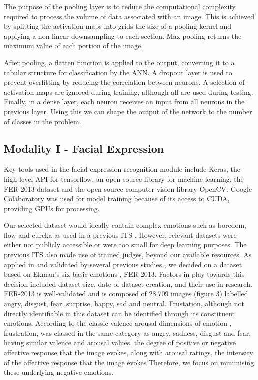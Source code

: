 \documentclass[12pt,a4paper]{article}
\begin{document}
The purpose of the pooling layer is to reduce the computational complexity required to process the volume of data associated with an image. This is achieved by splitting the activation maps into grids the size of a pooling kernel and applying a non-linear downsampling to each section. Max pooling returns the maximum value of each portion of the image.

After pooling, a flatten function is applied to the output, converting it to a tabular structure for classification by the ANN. A dropout layer is used to prevent overfitting by reducing the correlation between neurons. A selection of activation maps are ignored during training, although all are used during testing. Finally, in a dense layer, each neuron receives an input from all neurons in the previous layer. Using this we can shape the output of the network to the number of classes in the problem.

\subsection{Modality I - Facial Expression}
Key tools used in the facial expression recognition module include Keras, the high-level API for tensorflow, an open source library for machine learning, the FER-2013 dataset \cite{giannopoulos2018deep} and the open source computer vision library OpenCV. Google Colaboratory was used for model training because of its access to CUDA, providing GPUs for processing.

Our selected dataset would ideally contain complex emotions such as boredom, flow and eureka as used in a previous ITS \cite{barron2012intelligent}. However, relevant datasets were either not publicly accessible or were too small for deep learning purposes. The previous ITS also made use of trained judges, beyond our available resources. As applied in and validated by several previous studies
\cite{woolf2009affect}, we decided on a dataset based on Ekman's six basic emotions \cite{ekman1992argument}, FER-2013. Factors in play towards this decision included dataset size, date of dataset creation, and their use in research. FER-2013 is well-validated \cite{giannopoulos2018deep} and is composed of 28,709 images (figure 3) labelled angry, disgust, fear, surprise, happy, sad and neutral.  Frustation, although not directly identifiable in this dataset can be identified through its constituent emotions. According to the classic valence-arousal dimensions of emotion \cite{hepach2011conceptualizing}, frustration, was classed in the same category as angry, sadness, disgust and fear, having similar valence and arousal values. the degree of positive or negative affective response that the image evokes, along with arousal ratings, the intensity of the affective response that the image evokes Therefore, we focus on minimising these underlying negative emotions.
\end{document}
